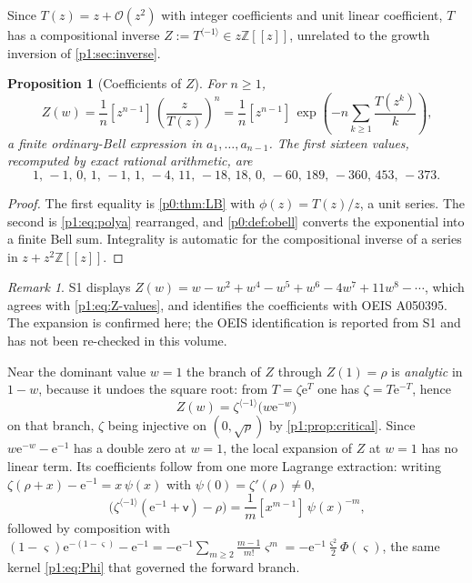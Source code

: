 \documentclass[11pt,a4paper,oneside]{book}
\theoremstyle{plain}
\newtheorem{proposition}[theorem]{Proposition}
\theoremstyle{definition}
\theoremstyle{remark}
\newtheorem{remark}[theorem]{Remark}
\newcommand{\Int}{\mathbb{Z}}
\newcommand{\e}{\mathrm{e}}
\newcommand{\Coef}[1]{[#1]\,}
\newcommand{\bigO}{\mathcal{O}}
\begin{document}
Since $T(z)=z+\bigO(z^{2})$ with integer coefficients and unit linear coefficient, $T$ has a
compositional inverse $Z:=T^{\langle-1\rangle}\in z\Int[[z]]$, unrelated to the growth
inversion of \cref{p1:sec:inverse}.

\begin{proposition}[Coefficients of $Z$]
\label{p1:prop:compositional}
For $n\ge1$,
\begin{equation}
 \Coef{w^{n}}Z(w)=\frac1n\Coef{z^{n-1}}\left(\frac{z}{T(z)}\right)^{n}
 =\frac1n\Coef{z^{n-1}}
 \exp\!\left(-n\sum_{k\ge1}\frac{T(z^{k})}{k}\right),
 \label{p1:eq:Z-lagrange}
\end{equation}
a finite ordinary-Bell expression in $a_1,\ldots,a_{n-1}$.  The first sixteen values,
recomputed by exact rational arithmetic, are
\begin{equation}
 1,\,-1,\,0,\,1,\,-1,\,1,\,-4,\,11,\,-18,\,18,\,0,\,-60,\,189,\,-360,
 \,453,\,-373 .
 \label{p1:eq:Z-values}
\end{equation}
\end{proposition}

\begin{proof}
The first equality is \cref{p0:thm:LB} with $\phi(z)=T(z)/z$, a unit series. The second is
\cref{p1:eq:polya} rearranged, and \cref{p0:def:obell} converts the exponential into a finite
Bell sum. Integrality is automatic for the compositional inverse of a series in
$z+z^{2}\Int[[z]]$.
\end{proof}

\begin{remark}
\textsf{S1} displays $Z(w)=w-w^{2}+w^{4}-w^{5}+w^{6}-4w^{7}+11w^{8}-\cdots$, which agrees with
\cref{p1:eq:Z-values}, and identifies the coefficients with OEIS A050395.  The expansion is
confirmed here; the OEIS identification is reported from \textsf{S1} and has not been
re-checked in this volume.
\end{remark}

Near the dominant value $w=1$ the branch of $Z$ through $Z(1)=\rho$ is \emph{analytic} in
$1-w$, because it undoes the square root: from $T=\zeta\e^{T}$ one has $\zeta=T\e^{-T}$, hence
\begin{equation}
 Z(w)=\zeta^{\langle-1\rangle}\bigl(w\e^{-w}\bigr)
 \label{p1:eq:Z-near-one}
\end{equation}
on that branch, $\zeta$ being injective on $(0,\sqrt\rho)$ by \cref{p1:prop:critical}.  Since
$w\e^{-w}-\e^{-1}$ has a double zero at $w=1$, the local expansion of $Z$ at $w=1$ has no
linear term.  Its coefficients follow from one more Lagrange extraction: writing
$\zeta(\rho+x)-\e^{-1}=x\,\psi(x)$ with $\psi(0)=\zeta'(\rho)\ne0$,
\begin{equation}
 \Coef{\mathsf v^{m}}\bigl(\zeta^{\langle-1\rangle}(\e^{-1}+\mathsf v)
 -\rho\bigr)=\frac1m\Coef{x^{m-1}}\psi(x)^{-m},
 \label{p1:eq:zeta-local-inverse}
\end{equation}
followed by composition with $(1-\varsigma)\e^{-(1-\varsigma)}-\e^{-1}
=-\e^{-1}\sum_{m\ge2}\frac{m-1}{m!}\varsigma^{m}
=-\e^{-1}\frac{\varsigma^{2}}{2}\Phi(\varsigma)$, the same kernel \cref{p1:eq:Phi} that
governed the forward branch.
\end{document}
